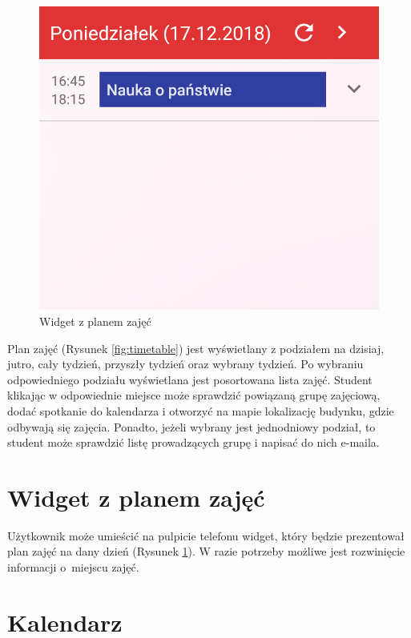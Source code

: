 \documentclass{pracamgr}
\begin{document}
\begin{figure}[p]
	\quad
	\begin{minipage}{0.3\textwidth}
		\centering
		\includegraphics[width=\textwidth]{img/calendar_widget.png}
		\caption{Widget z planem zajęć}\label{fig:calendar_widget}
		\medskip
	\end{minipage}
\end{figure}


Plan zajęć (Rysunek \ref{fig:timetable}) jest wyświetlany z podziałem na dzisiaj, jutro, cały tydzień, przyszły
tydzień oraz wybrany tydzień. Po wybraniu odpowiedniego podziału wyświetlana jest
posortowana lista zajęć. Student klikając w odpowiednie miejsce może sprawdzić
powiązaną grupę zajęciową, dodać spotkanie do kalendarza i otworzyć na mapie
lokalizację budynku, gdzie odbywają się zajęcia. Ponadto, jeżeli wybrany jest
jednodniowy podział, to student może sprawdzić listę prowadzących grupę i napisać
do nich e-maila.

\section{Widget z planem zajęć}

Użytkownik może umieścić na pulpicie telefonu widget, który będzie prezentował
plan zajęć na dany dzień (Rysunek \ref{fig:calendar_widget}). W razie potrzeby możliwe jest rozwinięcie informacji o~miejscu zajęć.

\section{Kalendarz}
\end{document}
